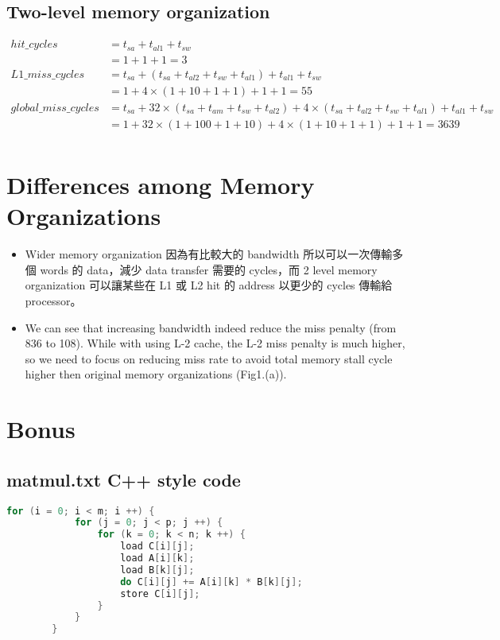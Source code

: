 \documentclass[12pt, a4paper]{article}
\begin{document}
\begin{CJK*}{UTF8}{bsmi}
        \subsection{Two-level memory organization}
            $
            \begin{aligned}
            hit\_cycles         & = t_{sa} + t_{al1} + t_{sw} \\
                               & = 1 + 1 + 1 = 3 \\
            L1\_miss\_cycles     & = t_{sa} + (t_{sa} + t_{al2} + t_{sw} + t_{al1}) + t_{al1} + t_{sw} \\
                               & = 1 + 4 \times (1 + 10 + 1 + 1) + 1 + 1 = 55 \\
            global\_miss\_cycles & = t_{sa} + 32 \times (t_{sa} + t_{am} + t_{sw} + t_{al2}) + 4 \times (t_{sa} + t_{al2} + t_{sw} + t_{al1}) + t_{al1} + t_{sw} \\
                               & = 1 + 32 \times (1 + 100 + 1 + 10) + 4 \times (1 + 10 + 1 + 1) + 1 + 1 = 3639 \\
            \end{aligned}
            $
    \newpage
    \section{Differences among Memory Organizations}
        \begin{itemize}
            \item Wider memory organization 因為有比較大的 bandwidth 所以可以一次傳輸多個 words 的 data，減少 data transfer 需要的 cycles，而 2 level memory organization 可以讓某些在 L1 或 L2 hit 的 address 以更少的 cycles 傳輸給 processor。
            \item We can see that increasing bandwidth indeed reduce the miss penalty (from 836 to 108). While with using L-2 cache, the L-2 miss penalty is much higher, so we need to focus on reducing miss rate to avoid total memory stall cycle higher then original memory organizations (Fig1.(a)).
        \end{itemize}
    \section{Bonus}
        \subsection{matmul.txt C++ style code}
        \begin{lstlisting}[language=C++]
        for (i = 0; i < m; i ++) {
            for (j = 0; j < p; j ++) {
                for (k = 0; k < n; k ++) {
                    load C[i][j];
                    load A[i][k];
                    load B[k][j];
                    do C[i][j] += A[i][k] * B[k][j];
                    store C[i][j];
                }
            }
        }
        \end{lstlisting}


\end{CJK*}
\end{document}
